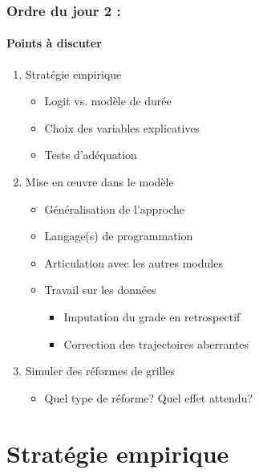 \documentclass[xcolor=table,ignorenonframetext,12pt]{beamer}
\newenvironment{choixmarges}[2]{\begin{list}{}{%
\setlength{\topsep}{0pt}%
\setlength{\leftmargin}{0pt}%
\setlength{\rightmargin}{0pt}%
\setlength{\listparindent}{\parindent}%
\setlength{\itemindent}{\parindent}%
\setlength{\parsep}{0pt plus 1pt}%
\addtolength{\leftmargin}{#1}%
\addtolength{\rightmargin}{#2}%
}\item }{\end{list}}
\begin{document}
\begin{frame}
\frametitle{Ordre du jour 2 : }
\framesubtitle{Points à discuter} 


\begin{choixmarges}{-0.5cm}{-0.5cm}


\begin{enumerate}

\item Stratégie empirique
	\begin{itemize}
	\item Logit vs. modèle de durée
	\item Choix des variables explicatives
	\item Tests d'adéquation
	\end{itemize}
	
\vspace{0.2cm}	
\item Mise en \oe uvre dans le modèle
	\begin{itemize}
	\item Généralisation de l'approche
	\item Langage(s) de programmation
	\item Articulation avec les autres modules
	\item Travail sur les données
		\begin{itemize}
		\item Imputation du grade en retrospectif
		\item Correction des trajectoires aberrantes 
		\end{itemize}
	\end{itemize}

\vspace{0.2cm}
\item Simuler des réformes de grilles
	\begin{itemize}
	\item Quel type de réforme? Quel effet attendu? 
	\end{itemize}



\end{enumerate}

\end{choixmarges}
\end{frame}



\section{Stratégie empirique}
\end{document}
